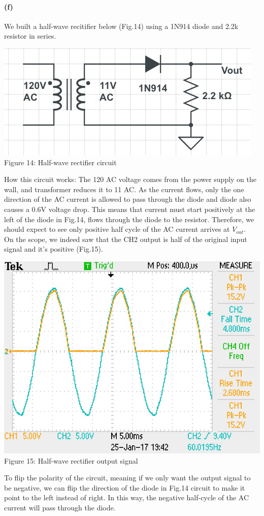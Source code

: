 \documentclass[]{article}
\begin{document}
	\paragraph{ (f)} 	
	We built a half-wave recitifier below (Fig.14) using a 1N914 diode and 2.2k resistor in series. 
		\begin{center}
			\includegraphics[scale=0.4]{f_circuit}\\
			Figure 14: Half-wave rectifier circuit
		\end{center}
	How this circuit works: The 120 AC voltage comes from the power supply on the wall, and transformer reduces it to 11 AC. As the current flows, only the one direction of the AC current is allowed to pass through the diode and diode also causes a 0.6V voltage drop. This means that current must start positively at the left of the diode in Fig.14, flows through the diode to the resistor. Therefore, we should expect to see only positive half cycle of the AC current arrives at $V_{out}$. \\On the scope, we indeed saw that the CH2 output is half of the original input signal and it's positive (Fig.15).
\begin{center}
	\includegraphics[scale=0.65]{f_halfrectifier}\\
	Figure 15: Half-wave rectifier output signal
\end{center}
To flip the polarity of the circuit, meaning if we only want the output signal to be negative, we can flip the direction of the diode in Fig.14 circuit to make it point to the left instead of right. In this way, the negative half-cycle of the AC current will pass through the diode.
\end{document}
